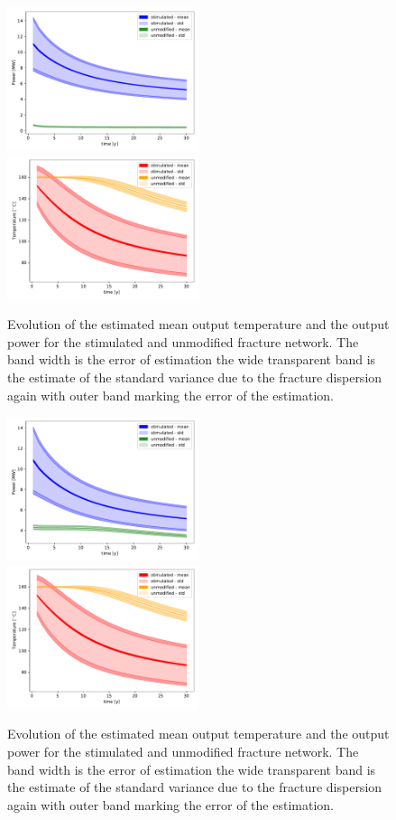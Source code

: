 \documentclass{article}
\begin{document}
\begin{figure}
\includegraphics[width=0.5\textwidth]{mlmc_random_frac/output_scenarios/output_por_disp_04/power_comparison.pdf}
\includegraphics[width=0.5\textwidth]{temp_comparison.pdf}
\caption{Evolution of the estimated mean output temperature and the output power for the stimulated and unmodified fracture network. The band width is the error of estimation the wide transparent band is the estimate of the standard variance due to the fracture dispersion again with outer band marking the error of the estimation.}
\end{figure}

\begin{figure}
\includegraphics[width=0.5\textwidth]{power_comparison.pdf}
\includegraphics[width=0.5\textwidth]{temp_comparison.pdf}
\caption{Evolution of the estimated mean output temperature and the output power for the stimulated and unmodified fracture network. The band width is the error of estimation the wide transparent band is the estimate of the standard variance due to the fracture dispersion again with outer band marking the error of the estimation.}
\end{figure}
\end{document}
